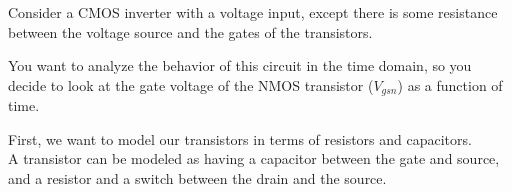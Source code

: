 

Consider a CMOS inverter with a voltage input, except there is some resistance between the voltage source and the gates of the transistors.



You want to analyze the behavior of this circuit in the time domain, so you decide to look at the gate voltage of the NMOS transistor ($V_{gsn}$) as a function of time.

\begin{enumerate}

\qitem First, we want to model our transistors in terms of resistors and capacitors. \\
A transistor can be modeled as having a capacitor between the gate and source, and a resistor and a switch between the drain and the source.

\end{enumerate}